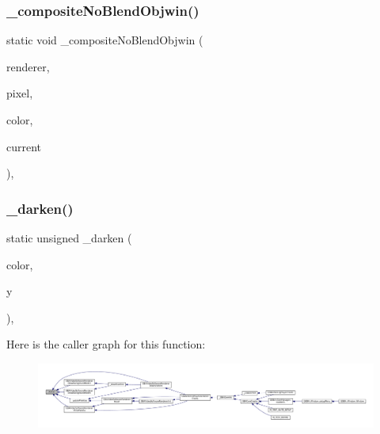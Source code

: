 \mbox{\label{software-private_8h_aaa1d30026aabbefc56e79c9a8bfa9d65}} 
\subsubsection{\texorpdfstring{\+\_\+composite\+No\+Blend\+Objwin()}{\_compositeNoBlendObjwin()}}
{\footnotesize\ttfamily static void \+\_\+composite\+No\+Blend\+Objwin (\begin{DoxyParamCaption}\item[{struct G\+B\+A\+Video\+Software\+Renderer $\ast$}]{renderer,  }\item[{uint32\+\_\+t $\ast$}]{pixel,  }\item[{uint32\+\_\+t}]{color,  }\item[{uint32\+\_\+t}]{current }\end{DoxyParamCaption})\hspace{0.3cm}{\ttfamily [inline]}, {\ttfamily [static]}}

\mbox{\label{software-private_8h_a68f599c06dc71b78236e144e7e86e136}} 
\subsubsection{\texorpdfstring{\+\_\+darken()}{\_darken()}}
{\footnotesize\ttfamily static unsigned \+\_\+darken (\begin{DoxyParamCaption}\item[{unsigned}]{color,  }\item[{\mbox{\hyperlink{ioapi_8h_a787fa3cf048117ba7123753c1e74fcd6}{int}}}]{y }\end{DoxyParamCaption})\hspace{0.3cm}{\ttfamily [inline]}, {\ttfamily [static]}}

Here is the caller graph for this function\+:
\nopagebreak
\begin{figure}[H]
\begin{center}
\leavevmode
\includegraphics[width=350pt]{software-private_8h_a68f599c06dc71b78236e144e7e86e136_icgraph}
\end{center}
\end{figure}
\mbox{\label{software-private_8h_a8ea8e737e4315c934bc23a636752df7a}} 
